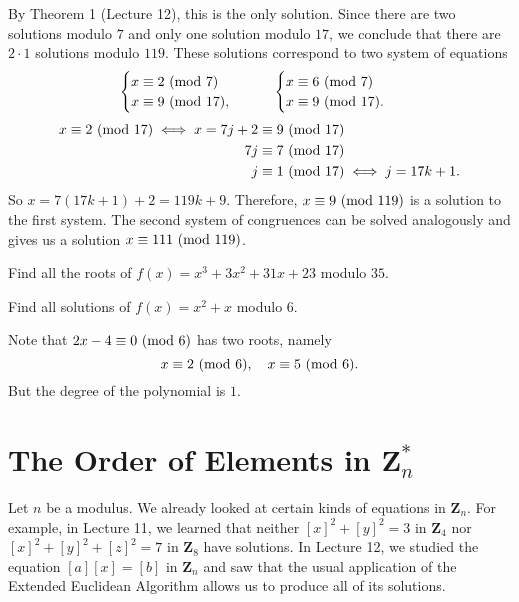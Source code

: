 \begin{Example}{}{}
    By Theorem 1 (Lecture 12), this is the only solution. Since there are two solutions modulo $ 7 $ and
    only one solution modulo $ 17 $, we conclude that there are $ 2\cdot 1 $ solutions modulo $ 119 $.
    These solutions correspond to two system of equations
    \[ \begin{cases}
            x\equiv 2\ (\mathrm{mod}\ 7) \\
            x\equiv 9\ (\mathrm{mod}\ 17),
        \end{cases}\qquad \begin{cases}
            x\equiv 6\ (\mathrm{mod}\ 7) \\
            x\equiv 9\ (\mathrm{mod}\ 17).
        \end{cases} \]
    \begin{align*}
        x\equiv 2\ (\mathrm{mod}\ 17)\iff x=7j+2 & \equiv 9\ (\mathrm{mod}\ 17)              \\
        7j                           & \equiv 7\ (\mathrm{mod}\ 17)              \\
        j                            & \equiv 1\ (\mathrm{mod}\ 17)\iff j=17k+1.
    \end{align*}
    So $ x=7(17k+1)+2=119k+9 $. Therefore, $ x\equiv 9\ (\mathrm{mod}\ 119) $ is a solution to the first system.
    The second system of congruences can be solved analogously and gives us a
    solution $ x\equiv 111\ (\mathrm{mod}\ 119) $.
\end{Example}
\begin{Exercise}{}{}
    Find all the roots of $ f(x)=x^3+3x^2+31x+23 $ modulo $ 35 $.
\end{Exercise}
\begin{Exercise}{}{}
    Find all solutions of $ f(x)=x^2+x $ modulo $ 6 $.
\end{Exercise}
\begin{Example}{}{}
    Note that $ 2x-4\equiv 0\ (\mathrm{mod}\ 6) $ has two roots, namely
    \[ x\equiv 2\ (\mathrm{mod}\ 6),\quad x\equiv 5\ (\mathrm{mod}\ 6). \]
    But the degree of the polynomial is $ 1 $.
\end{Example}
\section{The Order of Elements in \texorpdfstring{$ \mathbf{Z}_n^* $}{Zn*}}
Let $ n $ be a modulus. We already looked at certain kinds of equations in
$ \mathbf{Z}_n $. For example, in Lecture 11, we learned that neither
$ [x]^2+[y]^2=3 $ in $ \mathbf{Z}_4 $ nor $ [x]^2+[y]^2+[z]^2=7 $
in $ \mathbf{Z}_8 $ have solutions. In Lecture 12, we studied the equation
$ [a][x]=[b] $ in $ \mathbf{Z}_n $ and
saw that the usual application of the Extended Euclidean Algorithm allows us to produce all of its solutions.


